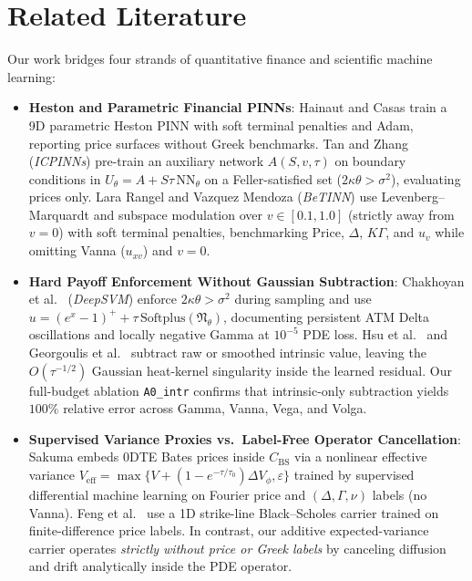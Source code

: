 \documentclass[preprint,12pt]{elsarticle}
\begin{document}
\section{Related Literature}
\label{sec:lit}

Our work bridges four strands of quantitative finance and scientific machine learning:
\begin{itemize}
  \item \textbf{Heston and Parametric Financial PINNs}: Hainaut and Casas \cite{hainaut2024option} train a 9D parametric Heston PINN with soft terminal penalties and Adam, reporting price surfaces without Greek benchmarks. Tan and Zhang \cite{tan2026icpinns} (\emph{ICPINNs}) pre-train an auxiliary network $A(S,v,\tau)$ on boundary conditions in $U_\theta = A + S\tau\,\mathrm{NN}_\theta$ on a Feller-satisfied set ($2\kappa\theta > \sigma^2$), evaluating prices only. Lara Rangel and Vazquez Mendoza \cite{lararangel2026betinn} (\emph{BeTINN}) use Levenberg--Marquardt and subspace modulation over $v \in [0.1, 1.0]$ (strictly away from $v = 0$) with soft terminal penalties, benchmarking Price, $\Delta$, $K\Gamma$, and $u_v$ while omitting Vanna ($u_{xv}$) and $v = 0$.
  \item \textbf{Hard Payoff Enforcement Without Gaussian Subtraction}: Chakhoyan et al.\ \cite{chakhoyan2025deepsvm} (\emph{DeepSVM}) enforce $2\kappa\theta > \sigma^2$ during sampling and use $u = (e^x - 1)^+ + \tau\,\mathrm{Softplus}(\mathfrak{N}_\theta)$, documenting persistent ATM Delta oscillations and locally negative Gamma at $10^{-5}$ PDE loss. Hsu et al.\ \cite{hsu2024accurate} and Georgoulis et al.\ \cite{georgoulis2026deep} subtract raw or smoothed intrinsic value, leaving the $O(\tau^{-1/2})$ Gaussian heat-kernel singularity inside the learned residual. Our full-budget ablation \texttt{A0\_intr} confirms that intrinsic-only subtraction yields $100\%$ relative error across Gamma, Vanna, Vega, and Volga.
  \item \textbf{Supervised Variance Proxies vs.\ Label-Free Operator Cancellation}: Sakuma \cite{sakuma2026dml} embeds 0DTE Bates prices inside $C_{\mathrm{BS}}$ via a nonlinear effective variance $V_{\mathrm{eff}} = \max\{V + (1 - e^{-\tau/\tau_0})\Delta V_\phi, \varepsilon\}$ trained by supervised differential machine learning on Fourier price and $(\Delta, \Gamma, \nu)$ labels (no Vanna). Feng et al.\ \cite{feng2026fideeponet} use a 1D strike-line Black--Scholes carrier trained on finite-difference price labels. In contrast, our additive expected-variance carrier operates \emph{strictly without price or Greek labels} by canceling diffusion and drift analytically inside the PDE operator.

\end{itemize}
\end{document}
